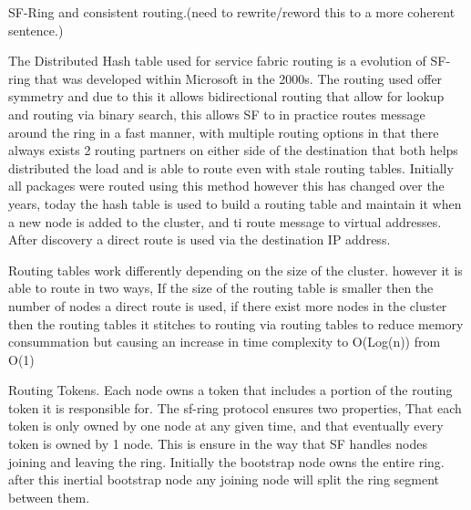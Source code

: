 \documentclass[a4paper,10pt,titlepage]{report}
\begin{document}
    SF-Ring and consistent routing.(need to rewrite/reword this to a more coherent sentence.)

    The Distributed Hash table used for service fabric routing is a evolution of SF-ring that was developed within Microsoft in the 2000s. The routing used offer symmetry and due to this it allows bidirectional routing that allow for lookup and routing via binary search, this allows SF to in practice routes message around the ring in a fast manner, with multiple routing options in that there always exists 2 routing partners on either side of the destination that both helps distributed the load and is able to route even with stale routing tables. Initially all packages were routed using this method however this has changed over the years, today the hash table is used to build a routing table and maintain it when a new node is added to the cluster, and ti route message to virtual addresses. After discovery a direct route is used via the destination IP address. \\
    \vspace{5mm}

    Routing tables work differently depending on the size of the cluster. however it is able to route in two ways, If the size of the routing table is smaller then the number of nodes a direct route is used, if there exist more nodes in the cluster then the routing tables it stitches to routing via routing tables to reduce memory consummation but causing an increase in time complexity to O(Log(n)) from O(1)\\
    \vspace{5mm}

    Routing Tokens.
    Each node owns a token that includes a portion of the routing token it is responsible for. The sf-ring protocol ensures two properties, That each token is only owned by one node at any given time, and that eventually every token is owned by 1 node. This is ensure in the way that SF handles nodes joining and leaving the ring. Initially the bootstrap node owns the entire ring. after this inertial bootstrap node any joining node will split the ring segment between them.\\
    \vspace{5mm}
\end{document}
